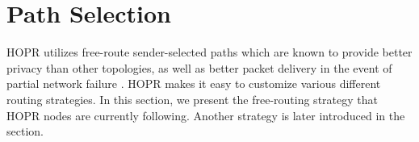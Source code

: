 \section{Path Selection}
\label{sec:path-selection}

HOPR utilizes free-route sender-selected paths which are known to provide better privacy than other topologies, as well as better packet delivery in the event of partial network failure \cite{Dingledine2004SynchronousBF}. HOPR makes it easy to customize various different routing strategies. In this section, we present the free-routing strategy that HOPR nodes are currently following. Another strategy is later introduced in the  section.




